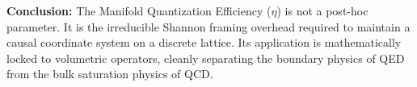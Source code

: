 \textbf{Conclusion:} The Manifold Quantization Efficiency ($\eta$) is not a post-hoc parameter. It is the irreducible Shannon framing overhead required to maintain a causal coordinate system on a discrete lattice. Its application is mathematically locked to volumetric operators, cleanly separating the boundary physics of QED from the bulk saturation physics of QCD.